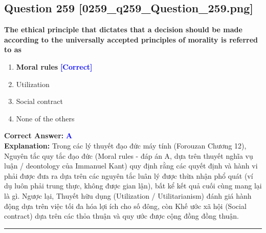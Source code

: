 \documentclass[11pt,a4paper]{article}
\begin{document}
\begin{minipage}{\textwidth}
\subsection*{Question 259 \quad \footnotesize{[0259\_q259\_Question\_259.png]}}
\noindent \textbf{The ethical principle that dictates that a decision should be made according to the universally accepted principles of morality is referred to as}

\begin{enumerate}[label=\Alph*.]
    \item \textbf{Moral rules} \hfill \textcolor{blue}{\textbf{[Correct]}}
    \item Utilization
    \item Social contract
    \item None of the others
\end{enumerate}

\noindent \textbf{Correct Answer:} \textcolor{blue}{\textbf{A}} \\[2pt]
\noindent \textbf{Explanation:} Trong các lý thuyết đạo đức máy tính (Forouzan Chương 12), Nguyên tắc quy tắc đạo đức (Moral rules - đáp án A, dựa trên thuyết nghĩa vụ luận / deontology của Immanuel Kant) quy định rằng các quyết định và hành vi phải được đưa ra dựa trên các nguyên tắc luân lý được thừa nhận phổ quát (ví dụ luôn phải trung thực, không được gian lận), bất kể kết quả cuối cùng mang lại là gì. Ngược lại, Thuyết hữu dụng (Utilization / Utilitarianism) đánh giá hành động dựa trên việc tối đa hóa lợi ích cho số đông, còn Khế ước xã hội (Social contract) dựa trên các thỏa thuận và quy ước được cộng đồng đồng thuận.

\par\vspace{0.3cm}
\hrule
\vspace{0.3cm}
\end{minipage}
\end{document}
